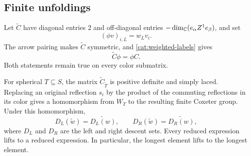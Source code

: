 \subsection{Finite unfoldings}

Let $\widetilde C$ have diagonal entries $2$ and off-diagonal entries
$-\dim_\mathbb C(e_\alpha Z^1e_\beta)$, and set
\begin{equation}
 (\phi v)_{i,L}=w_Lv_i.
 \label{cat:phi}
\end{equation}
The arrow pairing makes $\widetilde C$ symmetric, and
\eqref{cat:weighted-labels} gives
\begin{equation}
 \widetilde C\phi=\phi C.
 \label{cat:intertwining}
\end{equation}
Both statements remain true on every color submatrix.

\begin{lemma}
\label{cat:unfolding}
For spherical $T\subseteq S$, the matrix
$\widetilde C_{\widetilde T}$ is positive definite and simply laced.
Replacing an original reflection $s_i$ by the product of the
commuting reflections in its color gives a homomorphism from $W_T$
to the resulting finite Coxeter group.  Under this homomorphism,
\[
 D_L(\widetilde w)=\widetilde{D_L(w)},
 \qquad
 D_R(\widetilde w)=\widetilde{D_R(w)},
\]
where $D_L$ and $D_R$ are the left and right descent sets.  Every
reduced expression lifts to a reduced expression.  In particular,
the longest element lifts to the longest element.
\end{lemma}


